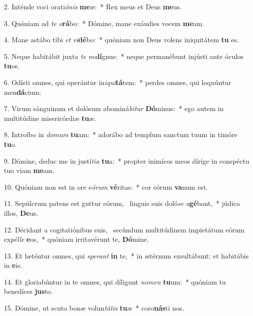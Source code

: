 2. Inténde voci orati\textit{ó}\textit{nis} \textbf{me}æ:~*  Rex meus et Deus \textbf{me}us.\

3. Quóniam ad \textit{te} \textit{o}\textbf{rá}bo:~*  Dómine, mane exáudies vocem \textbf{me}am.\

4. Mane astábo tibi \textit{et} \textit{vi}\textbf{dé}bo:~*  quóniam non Deus volens iniquitátem \textbf{tu} es.\

5. Neque habitábit juxta \textit{te} \textit{ma}\textbf{lí}gnus:~*  neque permanébunt injústi ante óculos \textbf{tu}os.\

6. Odísti omnes, qui operántur in\textit{i}\textit{qui}\textbf{tá}tem:~*  perdes omnes, qui loquúntur men\textbf{dá}cium.\

7. Virum sánguinum et dolósum abominá\textit{bi}\textit{tur} \textbf{Dó}minus:~*  ego autem in multitúdine misericórdiæ \textbf{tu}æ.\

8. Introíbo in \textit{do}\textit{mum} \textbf{tu}am:~*  adorábo ad templum sanctum tuum in timóre \textbf{tu}o.\

9. Dómine, deduc me in justí\textit{ti}\textit{a} \textbf{tu}a:~*  propter inimícos meos dírige in conspéctu tuo viam \textbf{me}am.\

10. Quóniam non est in ore e\textit{ó}\textit{rum} \textbf{vé}ritas:~*  cor eórum \textbf{va}num est.\

11. Sepúlcrum patens est guttur eórum, \dag\  linguis suis doló\textit{se} \textit{a}\textbf{gé}bant,~*  júdica illos, \textbf{De}us.\

12. Décidant a cogitatiónibus suis, \dag\  secúndum multitúdinem impietátum eórum ex\textit{pél}\textit{le} \textbf{e}os,~*  quóniam irritavérunt te, \textbf{Dó}mine.\

13. Et læténtur omnes, qui \textit{spe}\textit{rant} \textbf{in} te,~*  in ætérnum exsultábunt: et habitábis in \textbf{e}is.\

14. Et gloriabúntur in te omnes, qui díligunt \textit{no}\textit{men} \textbf{tu}um:~*  quóniam tu benedíces \textbf{jus}to.\

15. Dómine, ut scuto bonæ volun\textit{tá}\textit{tis} \textbf{tu}æ~*  coro\textbf{nás}ti nos.\

